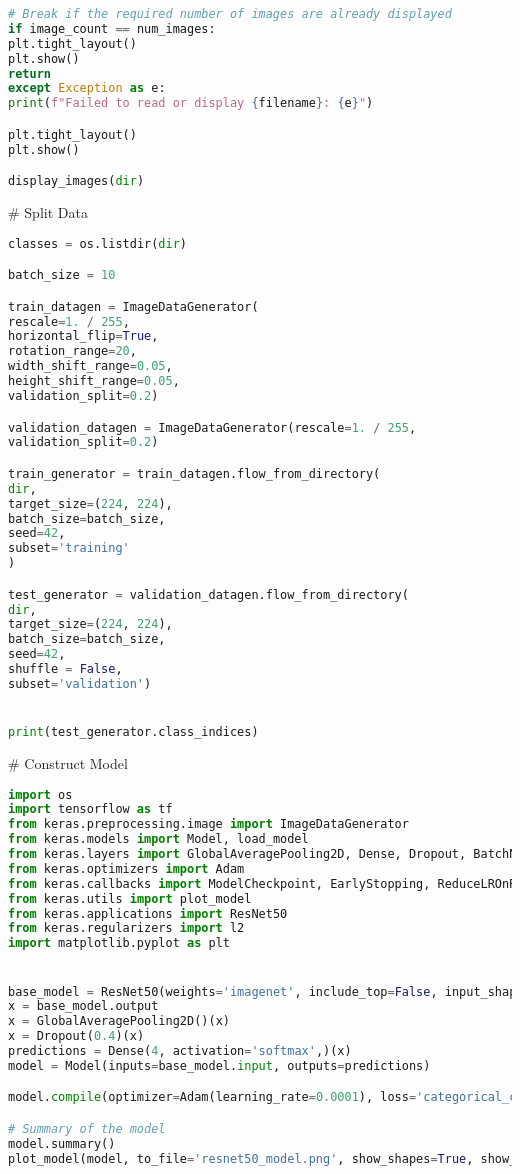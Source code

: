\begin{lstlisting}[language=Python]
# Break if the required number of images are already displayed
if image_count == num_images:
plt.tight_layout()
plt.show()
return
except Exception as e:
print(f"Failed to read or display {filename}: {e}")

plt.tight_layout()
plt.show()

display_images(dir)
\end{lstlisting}

# Split Data
\begin{lstlisting}[language=Python]
classes = os.listdir(dir)

batch_size = 10

train_datagen = ImageDataGenerator(
rescale=1. / 255,
horizontal_flip=True,
rotation_range=20,
width_shift_range=0.05,
height_shift_range=0.05,
validation_split=0.2)

validation_datagen = ImageDataGenerator(rescale=1. / 255,
validation_split=0.2)

train_generator = train_datagen.flow_from_directory(
dir,
target_size=(224, 224),
batch_size=batch_size,
seed=42,
subset='training'
)

test_generator = validation_datagen.flow_from_directory(
dir,
target_size=(224, 224),
batch_size=batch_size,
seed=42,
shuffle = False,
subset='validation')


print(test_generator.class_indices)
\end{lstlisting}

# Construct Model
\begin{lstlisting}[language=Python]
import os
import tensorflow as tf
from keras.preprocessing.image import ImageDataGenerator
from keras.models import Model, load_model
from keras.layers import GlobalAveragePooling2D, Dense, Dropout, BatchNormalization
from keras.optimizers import Adam
from keras.callbacks import ModelCheckpoint, EarlyStopping, ReduceLROnPlateau
from keras.utils import plot_model
from keras.applications import ResNet50
from keras.regularizers import l2
import matplotlib.pyplot as plt


base_model = ResNet50(weights='imagenet', include_top=False, input_shape=(224,224,3))
x = base_model.output
x = GlobalAveragePooling2D()(x)
x = Dropout(0.4)(x)
predictions = Dense(4, activation='softmax',)(x)
model = Model(inputs=base_model.input, outputs=predictions)

model.compile(optimizer=Adam(learning_rate=0.0001), loss='categorical_crossentropy', metrics=['accuracy'])

# Summary of the model
model.summary()
plot_model(model, to_file='resnet50_model.png', show_shapes=True, show_layer_names=True)
\end{lstlisting}

